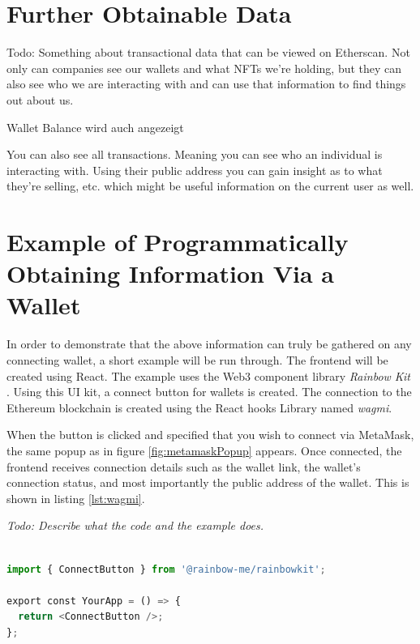 %
%
\section{Further Obtainable Data}
\label{sec:methodology:moreData}

Todo: Something about transactional data that can be viewed on Etherscan. Not only can companies see our wallets and what NFTs we're holding, but they can also see who we are interacting with and can use that information to find things out about us.

Wallet Balance wird auch angezeigt

You can also see all transactions. Meaning you can see who an individual is interacting with. Using their public address you can gain insight as to what they're selling, etc. which might be useful information on the current user as well.

%
%
\section{Example of Programmatically Obtaining Information Via a Wallet}
\label{sec:methodology:code}
In order to demonstrate that the above information can truly be gathered on any connecting wallet, a short example will be run through. The frontend will be created using React. The example uses the Web3 component library \textit{Rainbow Kit} \cite{rainbowKit}. Using this UI kit, a connect button for wallets is created. The connection to the Ethereum blockchain is created using the React hooks Library named \textit{wagmi}.

When the button is clicked and specified that you wish to connect via MetaMask, the same popup as in figure \ref{fig:metamaskPopup} appears. Once connected, the frontend receives connection details such as the wallet link, the wallet's connection status, and most importantly the public address of the wallet. This is shown in listing \ref{lst:wagmi}.


\textit{\color{red}Todo: Describe what the code and the example does.}

\begin{center}
\begin{lstlisting}[label=lst:rainbow ,language=python, caption=An example of implementing a connect wallet button within the frontend of a webapp using the \textit{RainbowKit} UI Library \cite{rainbowKit}., captionpos=b]

import { ConnectButton } from '@rainbow-me/rainbowkit';

export const YourApp = () => {
  return <ConnectButton />;
};

\end{lstlisting}
\end{center}




